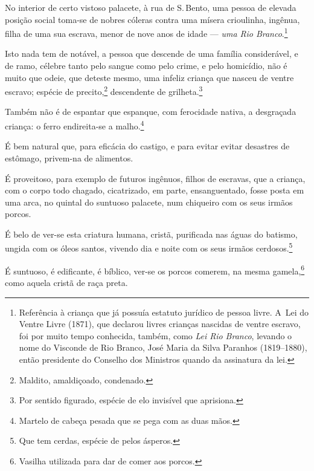 {No interior de certo vistoso palacete, à rua de S.\,Bento, uma pessoa de
elevada posição social toma-se de nobres cóleras contra uma mísera
crioulinha, ingênua, filha de uma sua escrava, menor de nove anos de
idade --- \emph{uma Rio Branco}.\footnote{Referência à criança que já
  possuía estatuto jurídico de pessoa livre. A~Lei do Ventre Livre
  (1871), que declarou livres crianças nascidas de ventre escravo, foi
  por muito tempo conhecida, também, como \emph{Lei Rio Branco}, levando
  o nome do Visconde de Rio Branco, José Maria da Silva Paranhos
  (1819--1880), então presidente do Conselho dos Ministros quando da assinatura da lei.}

Isto nada tem de notável, a pessoa que descende de uma família
considerável, e de ramo, célebre tanto pelo sangue como pelo crime, e
pelo homicídio, não é muito que odeie, que deteste mesmo, uma infeliz
criança que nasceu de ventre escravo; espécie de precito,\footnote{
  Maldito, amaldiçoado, condenado.} descendente de grilheta.\footnote{
  Por sentido figurado, espécie de elo invisível que aprisiona.}

Também não é de espantar que espanque, com ferocidade nativa, a
desgraçada criança: o ferro endireita-se a malho.\footnote{Martelo de
  cabeça pesada que se pega com as duas mãos.}

É bem natural que, para eficácia do castigo, e para evitar evitar %
desastres de estômago, privem-na de alimentos.

É proveitoso, para exemplo de futuros ingênuos, filhos de escravas, que
a criança, com o corpo todo chagado, cicatrizado, em parte,
ensanguentado, fosse posta em uma arca, no quintal do suntuoso palacete,
num chiqueiro com os seus irmãos porcos.

É belo de ver-se esta criatura humana, cristã, purificada nas águas do
batismo, ungida com os óleos santos, vivendo dia e noite com os seus
irmãos cerdosos.\footnote{Que tem cerdas, espécie de pelos ásperos.}

É suntuoso, é edificante, é bíblico, ver-se os porcos comerem, na mesma
gamela,\footnote{Vasilha utilizada para dar de comer aos porcos.} como
aquela cristã de raça preta.

}
